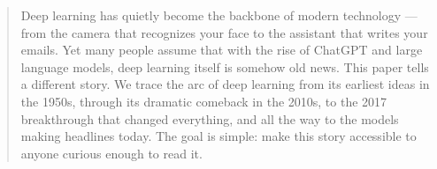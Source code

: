 \begin{abstract}
Deep learning has quietly become the backbone of modern technology --- from the camera that recognizes your face to the assistant that writes your emails.
Yet many people assume that with the rise of ChatGPT and large language models, deep learning itself is somehow old news.
This paper tells a different story.
We trace the arc of deep learning from its earliest ideas in the 1950s, through its dramatic comeback in the 2010s, to the 2017 breakthrough that changed everything, and all the way to the models making headlines today.
The goal is simple: make this story accessible to anyone curious enough to read it.
\end{abstract}
